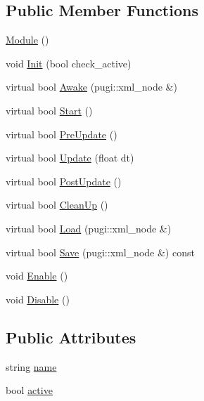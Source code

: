 \subsection*{Public Member Functions}
\begin{DoxyCompactItemize}
\item 
\mbox{\hyperlink{class_module_a5a240a8a9ab1813b17bcb810b24ceaea}{Module}} ()
\item 
void \mbox{\hyperlink{class_module_ad755410a1c48d3e6dc755c4ebd29f348}{Init}} (bool check\+\_\+active)
\item 
virtual bool \mbox{\hyperlink{class_module_a4a283650cf8a73aa0b5599106bc2ba6c}{Awake}} (pugi\+::xml\+\_\+node \&)
\item 
virtual bool \mbox{\hyperlink{class_module_aaf67046743296e8de310039a1dc95d86}{Start}} ()
\item 
virtual bool \mbox{\hyperlink{class_module_a2c64af5917825500cf6f0497258bc398}{Pre\+Update}} ()
\item 
virtual bool \mbox{\hyperlink{class_module_ac1a7b6dca73586b9cce2e67647af58d8}{Update}} (float dt)
\item 
virtual bool \mbox{\hyperlink{class_module_afc355df351a4483850c3f512823ceebd}{Post\+Update}} ()
\item 
virtual bool \mbox{\hyperlink{class_module_a77d7a006e42c0bd10110e1adbd4598cb}{Clean\+Up}} ()
\item 
virtual bool \mbox{\hyperlink{class_module_adf4ae9320f5f244c47b472348fb3c1f9}{Load}} (pugi\+::xml\+\_\+node \&)
\item 
virtual bool \mbox{\hyperlink{class_module_aae4bfdba7949d0f94bd8073b3a27dc3d}{Save}} (pugi\+::xml\+\_\+node \&) const
\item 
void \mbox{\hyperlink{class_module_a549c4b33f582f353436b57de5dfd39da}{Enable}} ()
\item 
void \mbox{\hyperlink{class_module_a18ea1b1701a3d4e26ff77400a85b6916}{Disable}} ()
\end{DoxyCompactItemize}
\subsection*{Public Attributes}
\begin{DoxyCompactItemize}
\item 
string \mbox{\hyperlink{class_module_a06c326572272c938b3f2a01ee75e56c9}{name}}
\item 
bool \mbox{\hyperlink{class_module_a59cb26d32bc36a6c3415572fb46d9be5}{active}}
\end{DoxyCompactItemize}


